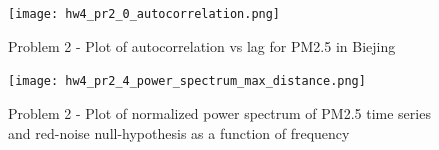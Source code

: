 \documentclass[12pt]{article}
\begin{document}
\begin{figure}
\begin{center}
\texttt{[image: hw4\_pr2\_0\_autocorrelation.png]}
\caption{Problem 2 - Plot of autocorrelation vs lag for PM2.5 in Biejing}{\label{fig:problem-1-a}}
\end{center}
\end{figure}

\begin{figure}
\begin{center}
\texttt{[image: hw4\_pr2\_4\_power\_spectrum\_max\_distance.png]}
\caption{Problem 2 - Plot of normalized power spectrum of PM2.5 time series and red-noise null-hypothesis as a function of frequency}{\label{fig:problem-1-a}}
\end{center}
\end{figure}
\end{document}
